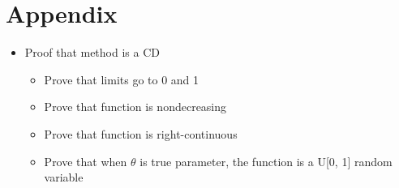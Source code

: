 \documentclass{article}
\begin{document}
\section{Appendix}
\begin{itemize}
  \item Proof that method is a CD
  \begin{itemize}
    \item Prove that limits go to 0 and 1
    \item Prove that function is nondecreasing
    \item Prove that function is right-continuous
    \item Prove that when $\theta$ is true parameter, the function is a U[0, 1] random variable
  \end{itemize}
\end{itemize}
\end{document}
